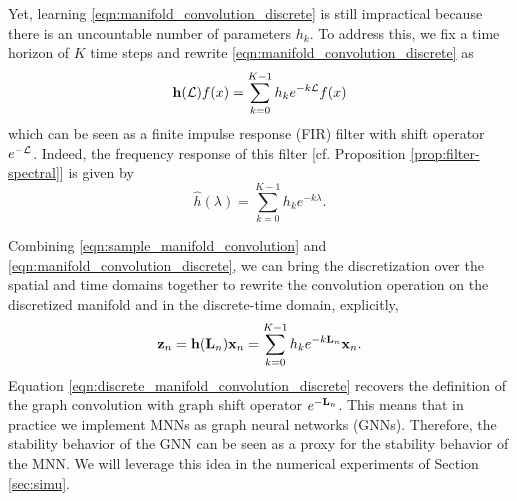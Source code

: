 Yet, learning \eqref{eqn:manifold_convolution_discrete} is still impractical because there is an uncountable number of parameters $h_k$. To address this, we fix a time horizon of $K$ time steps and rewrite \eqref{eqn:manifold_convolution_discrete} as
\begin{equation}
\label{eqn:manifold_convolution_discrete}
    {\ensuremath{\mathbf h}}({\mathcal L}) f(x)= \sum_{k=0}^{K-1} h_k e^{-k{\mathcal L}}f(x)
\end{equation}
which can be seen as a finite impulse response (FIR) filter with shift operator $e^{-{\mathcal L}}$. 
Indeed, the frequency response of this filter [cf. Proposition \ref{prop:filter-spectral}] is given by
\begin{equation}
    \hat{h}(\lambda)= \sum_{k=0}^{K-1} h_k e^{-k\lambda}.
\end{equation}

Combining \eqref{eqn:sample_manifold_convolution} and \eqref{eqn:manifold_convolution_discrete}, we can bring the discretization over the spatial and time domains together to rewrite the convolution operation on the discretized manifold and in the discrete-time domain, explicitly,
\begin{equation}
\label{eqn:discrete_manifold_convolution_discrete}
  {\ensuremath{\mathbf z}}_n=  {\mathbf h}({\mathbf L}_n) {\mathbf x}_n = \sum_{k=0}^{K-1} h_k e^{-k{\mathbf L}_n}{\mathbf x}_n.
\end{equation}
Equation \eqref{eqn:discrete_manifold_convolution_discrete} recovers the definition of the graph convolution \cite{gama2020graphs} with graph shift operator $e^{-{\mathbf L}_n}$. This means that in practice we implement MNNs as graph neural networks (GNNs). Therefore, the stability behavior of the GNN can be seen as a proxy for the stability behavior of the MNN. We will leverage this idea in the numerical experiments of Section \ref{sec:simu}.

